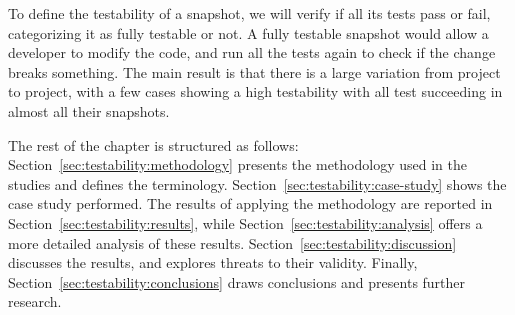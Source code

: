 
To define the testability of a snapshot, we will verify if all its tests pass or fail, categorizing it as fully testable or not.
A fully testable snapshot would allow a developer to modify the code, and run all the tests again to check if the change breaks something.
The main result is that there is a large variation from project to project, with a few cases showing a high testability with all test succeeding in almost all their snapshots. 



The rest of the chapter is structured as follows:
Section~\ref{sec:testability:methodology} presents the methodology used in the studies and defines the terminology. 
Section~\ref{sec:testability:case-study} shows the case study performed.
The results of applying the methodology are reported in Section~\ref{sec:testability:results}, while Section~\ref{sec:testability:analysis} offers a more detailed analysis of these results.
Section~\ref{sec:testability:discussion} discusses the results, and explores threats to their validity.
Finally, Section~\ref{sec:testability:conclusions} draws conclusions and presents further research.
